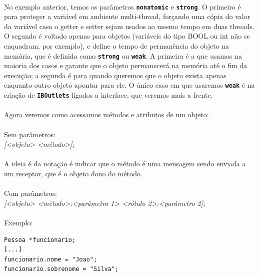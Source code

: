 \documentclass[a4paper,12pt,brazil,doubleside]{book}
\begin{document}
\begin{singlespace}
\paragraph{}No exemplo anterior, temos os parâmetros \texttt{\textbf{nonatomic}} e \texttt{\textbf{strong}}. O primeiro é para proteger a variável em ambiente multi-thread, forçando uma cópia do valor da variável caso o getter e setter sejam usados ao mesmo tempo em duas threads. O segundo é voltado apenas para objetos (variáveis do tipo BOOL ou int não se enquadram, por exemplo), e define o tempo de permanência do objeto na memória, que é definida como \texttt{\textbf{strong}} ou \texttt{\textbf{weak}}. A primeira é a que usamos na maioria dos casos e garante que o objeto permanecerá na memória até o fim da execução; a segunda é para quando queremos que o objeto exista apenas enquanto outro objeto apontar para ele. O único caso em que usaremos \texttt{\textbf{weak}} é na criação de \texttt{\textbf{IBOutlets}} ligados a interface, que veremos mais a frente.

\paragraph{}Agora veremos como acessamos métodos e atributos de um objeto:

\paragraph{}Sem parâmetros:\\
\emph{[<objeto> <método>];}

\paragraph{}A ideia é da notação é indicar que o método é uma mensagem sendo enviada a um receptor, que é o objeto dono do método.

\paragraph{}Com parâmetros:\\
\emph{[<objeto> <método>:<parâmetro 1> <rótulo 2>:<parâmetro 2];}

\paragraph{}Exemplo:

\begin{listing}
\begin{verbatim}
Pessoa *funcionario;
[...]
funcionario.nome = "Joao";
funcionario.sobrenome = "Silva";


\end{verbatim}
\end{listing}
\end{singlespace}
\end{document}
